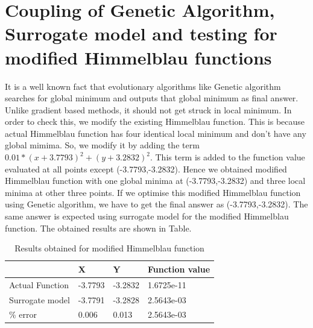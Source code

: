 \section{Coupling of Genetic Algorithm, Surrogate model and testing for modified Himmelblau functions}
It is a well known fact that evolutionary algorithms like Genetic algorithm searches for global minimum and outputs that global minimum as final answer. Unlike gradient based methods, it should not get struck in local minimum. In order to check this, we modify the existing Himmelblau function. This is because actual Himmelblau function has four identical local minimum and don't have any global mimima. So, we modify it by adding the term $  0.01* (x + 3.7793)^2 + (y + 3.2832)^2 $. This term is added to the function value evaluated at all points except (-3.7793,-3.2832). Hence we obtained modified Himmelblau function with one global minima at (-3.7793,-3.2832) and three local minima at other three points. If we optimise this modified Himmelblau function using Genetic algorithm, we have to get the final answer as (-3.7793,-3.2832). The same answer is expected using surrogate model for the modified Himmelblau function. The obtained results are shown in Table.

\begin{table}[H]
	\centering
	\caption{Results obtained for modified Himmelblau function}
	\label{Results obtained for modified Himmelblau function}
	\begin{tabular}{llll}
		\hline \hline
		& X & Y & Function value \\ \hline
		Actual Function & -3.7793 &-3.2832 &1.6725e-11 \\
		Surrogate model & -3.7791 &-3.2828 & 2.5643e-03 \\ \hline
		\% error & 0.006 & 0.013 & 2.5643e-03 \\
		\hline \hline
		
		
		
		
	\end{tabular}
\end{table}









